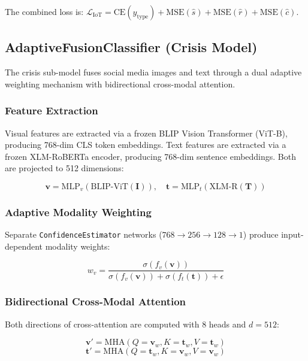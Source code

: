 \documentclass[journal]{IEEEtran}
\begin{document}
The combined loss is: $\mathcal{L}_\text{IoT} = \text{CE}(\hat{y}_\text{type}) + \text{MSE}(\hat{s}) + \text{MSE}(\hat{r}) + \text{MSE}(\hat{c})$.

\subsection{AdaptiveFusionClassifier (Crisis Model)}

The crisis sub-model fuses social media images and text through a dual adaptive weighting mechanism with bidirectional cross-modal attention.

\subsubsection{Feature Extraction}

Visual features are extracted via a frozen BLIP Vision Transformer (ViT-B), producing 768-dim CLS token embeddings. Text features are extracted via a frozen XLM-RoBERTa encoder, producing 768-dim sentence embeddings. Both are projected to 512 dimensions:

\begin{equation}
\mathbf{v} = \text{MLP}_v(\text{BLIP-ViT}(\mathbf{I})), \quad \mathbf{t} = \text{MLP}_t(\text{XLM-R}(\mathbf{T}))
\end{equation}

\subsubsection{Adaptive Modality Weighting}

Separate \texttt{ConfidenceEstimator} networks ($768 \to 256 \to 128 \to 1$) produce input-dependent modality weights:

\begin{equation}
w_v = \frac{\sigma(f_v(\mathbf{v}))}{\sigma(f_v(\mathbf{v})) + \sigma(f_t(\mathbf{t})) + \epsilon}
\end{equation}

\subsubsection{Bidirectional Cross-Modal Attention}

Both directions of cross-attention are computed with 8 heads and $d=512$:

\begin{equation}
\mathbf{v}' = \text{MHA}(Q{=}\mathbf{v}_w, K{=}\mathbf{t}_w, V{=}\mathbf{t}_w)
\end{equation}
\begin{equation}
\mathbf{t}' = \text{MHA}(Q{=}\mathbf{t}_w, K{=}\mathbf{v}_w, V{=}\mathbf{v}_w)
\end{equation}
\end{document}
